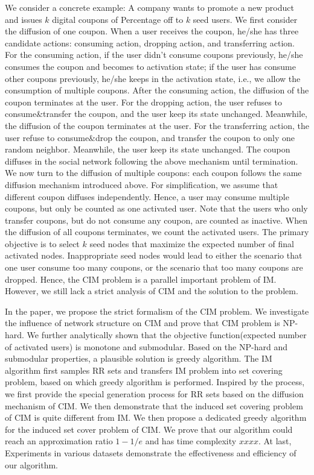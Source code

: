 \documentclass[sigconf]{acmart}
\begin{document}
We consider a concrete example:
A company wants to promote a new product and issues $k$ digital coupons of Percentage off
to $k$ seed users. We first consider the diffusion of one coupon. When a user receives the coupon, he/she has three candidate actions: consuming action, dropping action, and transferring action. For the consuming action, if the user didn't consume coupons previously, he/she consumes the coupon and becomes to activation state; if the user has consume other coupons previously, he/she keeps in the activation state, i.e., we allow the consumption of multiple coupons. After the consuming action, the diffusion of the coupon terminates at the user.
 For the dropping action, the user refuses to consume\&transfer the coupon, and the user keep its state unchanged. Meanwhile, the diffusion of the coupon terminates at the user.
 For the transferring action, the user refuse to consume\&drop the coupon, and transfer the coupon to only one random neighbor. Meanwhile, the user keep its state unchanged. The coupon diffuses in the social network following the above mechanism until termination. We now turn to the diffusion of multiple coupons: each coupon follows the same diffusion mechanism introduced above.
  For simplification, we assume that different coupon diffuses independently. Hence, a user may consume multiple coupons, but only be counted as one activated user. Note that the users who only transfer coupons, but do not consume any coupon, are counted as inactive. 
 When the diffusion of all coupons terminates, we count the activated users. 
The primary objective is to select $k$ seed nodes that maximize the
expected number of final activated nodes. Inappropriate seed nodes would lead to either the scenario that one user consume too many coupons, or the scenario that too many coupons are dropped. Hence, the CIM problem is a parallel important problem of IM. However, we still lack a strict analysis of CIM and the solution to the problem.

In the paper, we propose the strict formalism of the CIM problem. We investigate the influence of network structure on CIM and prove that CIM problem is NP-hard. We further analytically shown that 
the objective function(expected number of activated users) is monotone and submodular. Based on the NP-hard and submodular properties,  a plausible solution is greedy algorithm. The IM algorithm first samples RR sets and transfers IM problem into set covering problem, based on which greedy algorithm is performed. Inspired by the process, we first provide the special generation process for RR sets based on the diffusion mechanism of CIM. We then demonstrate that the induced set covering problem of CIM is quite different from IM. We then propose a dedicated greedy algorithm for the induced set cover problem of CIM. We prove that our algorithm could reach an approximation ratio $1-1/e$ and has time complexity \textcolor[rgb]{1.00,0.00,0.00}{$xxxx$}. At last, Experiments in various datasets demonstrate the effectiveness and efficiency of our algorithm. 
\end{document}

